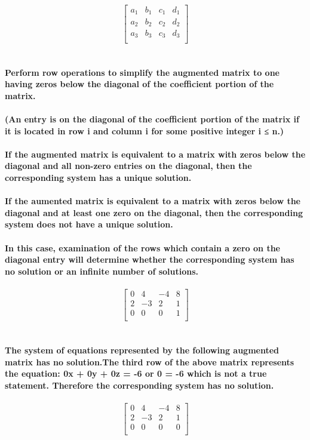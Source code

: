 \documentclass[15pt]{article}
\begin{document}
\[
 \left[\begin{array}{rrr|r}
a_1 & b_1 & c_1 & d_1\\
a_2 & b_2 & c_2 & d_2\\
a_3 & b_3 & c_3 & d_3\\
   \end{array} \right]
\]\\
\\
\textbf{Perform row operations to simplify the augmented matrix to one having zeros below the diagonal of the coefficient portion of the matrix.\\
\\
(An entry is on the diagonal of the coefficient
portion of the matrix if it is located in row i and
column i for some positive integer i ≤ n.)\\
\\
If the augmented matrix is equivalent to a matrix
with zeros below the diagonal and all non-zero
entries on the diagonal, then the corresponding
system has a unique solution. \\
\\
If the aumented matrix is equivalent to a matrix
with zeros below the diagonal and at least one
zero on the diagonal, then the corresponding
system does not have a unique solution. \\
\\
In this case, examination of the rows which contain
a zero on the diagonal entry will determine
whether the corresponding system has no solution
or an infinite number of solutions.
}\\
\\
\[
\left[\begin{array}{rrr|r}
  0 &  4 & -4 & 8\\
  2 & -3 &  2 & 1\\
  0 &  0 &  0 & 1\\
  \end{array}\right]
  \]\\
  \\
\textbf{The system of equations represented by the following
augmented matrix has no solution.The third row of the above matrix represents
the equation: 0x + 0y + 0z = -6 or 0 = -6 which is not
a true statement. Therefore the corresponding system
has no solution.}\\
\\
\[
\left[\begin{array}{rrr|r}
  0 &  4 & -4 & 8\\
  2 & -3 &  2 & 1\\
  0 &  0 &  0 & 0\\
  \end{array}\right]
  \]\\
\end{document}
